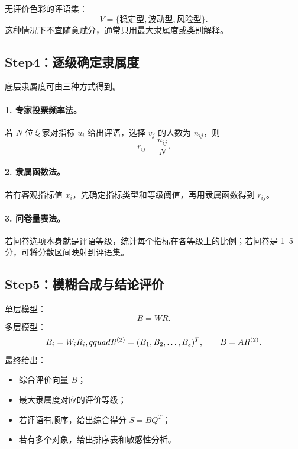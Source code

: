 \documentclass[UTF8,zihao=-4,fontset=none]{ctexart}
\begin{document}
无评价色彩的评语集：
\begin{equation}
  V=\{\text{稳定型},\text{波动型},\text{风险型}\}.
\end{equation}
这种情况下不宜随意赋分，通常只用最大隶属度或类别解释。

\subsection{Step4：逐级确定隶属度}
底层隶属度可由三种方式得到。

\paragraph{1. 专家投票频率法。} 若 $N$ 位专家对指标 $u_i$ 给出评语，选择 $v_j$ 的人数为 $n_{ij}$，则
\begin{equation}
  r_{ij}=\frac{n_{ij}}{N}.
\end{equation}

\paragraph{2. 隶属函数法。} 若有客观指标值 $x_i$，先确定指标类型和等级阈值，再用隶属函数得到 $r_{ij}$。

\paragraph{3. 问卷量表法。} 若问卷选项本身就是评语等级，统计每个指标在各等级上的比例；若问卷是 1--5 分，可将分数区间映射到评语集。

\subsection{Step5：模糊合成与结论评价}
单层模型：
\begin{equation}
  B=WR.
\end{equation}
多层模型：
\begin{equation}
  B_i=W_iR_i,\\qquad R^{(2)}=(B_1,B_2,\ldots,B_s)^T,
  \qquad B=AR^{(2)}.
\end{equation}
最终给出：
\begin{itemize}[leftmargin=2.2em]
  \item 综合评价向量 $B$；
  \item 最大隶属度对应的评价等级；
  \item 若评语有顺序，给出综合得分 $S=BQ^T$；
  \item 若有多个对象，给出排序表和敏感性分析。
\end{itemize}
\end{document}
